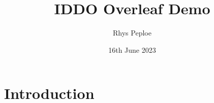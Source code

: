 \documentclass{article}
\title{IDDO Overleaf Demo}
\author{Rhys Peploe }
\date{16th June 2023}
\begin{document}
\maketitle

\section{Introduction}
\end{document}
